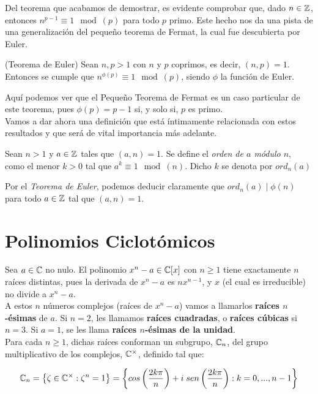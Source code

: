 Del teorema que acabamos de demostrar, es evidente comprobar que, dado $n \in \mathbb{Z}$, entonces $n^{p-1} \equiv 1 \mod(p)$ para todo $p$ primo. Este hecho nos da una pista de una generalización del pequeño teorema de Fermat, la cual fue descubierta por Euler.

\begin{teorema}{(Teorema de Euler)}
	Sean $n, p > 1$ con $n$ y $p$ coprimos, es decir, $(n, p) = 1$. Entonces se cumple que $n^{\phi(p)} \equiv 1 \mod(p)$, siendo $\phi$ la función de Euler.
\end{teorema}

Aquí podemos ver que el Pequeño Teorema de Fermat es un caso particular de este teorema, pues $\phi(p) = p-1$ si, y solo si, $p$ es primo.\\

Vamos a dar ahora una definición que está íntimamente relacionada con estos resultados y que será de vital importancia más adelante.

\begin{definicion}
	Sean $n > 1$ y $a \in \mathbb{Z}$ tales que $(a, n) = 1$. Se define el \textit{orden de $a$ módulo $n$}, como el menor $k > 0$ tal que $a^k \equiv 1 \mod(n)$. Dicho $k$ se denota por $ord_n(a)$
\end{definicion}

Por el \textit{Teorema de Euler}, podemos deducir claramente que $ord_n(a) \mid \phi(n)$ para todo $a \in \mathbb{Z}$ tal que $(a, n) = 1$.

\section{Polinomios Ciclotómicos}

Sea $a \in \mathbb{C}$ no nulo. El polinomio $x^n - a \in \mathbb{C}[x]$ con $n \geq 1$ tiene exactamente $n$ raíces distintas, pues la derivada de $x^n - a$ es $nx^{n-1}$, y $x$ (el cual es irreducible) no divide a $x^n - a$.\\

A estos $n$ números complejos (raíces de $x^n - a$) vamos a llamarlos \textbf{raíces $n$-ésimas} de $a$. Si $n=2$, les llamamos \textbf{raíces cuadradas}, o \textbf{raíces cúbicas} si $n=3$. Si $a=1$, se les llama \textbf{raíces $n$-ésimas de la unidad}.\\

Para cada $n \geq 1$, dichas raíces conforman un subgrupo, $\mathbb{C}_n$, del grupo multiplicativo de los complejos, $\mathbb{C}^\times$, definido tal que:

\[ \mathbb{C}_n = \left\lbrace \zeta \in \mathbb{C}^\times : \zeta^n = 1 \right\rbrace = \left\lbrace cos\left(\frac{2k\pi}{n}\right) + i\;sen\left(\frac{2k\pi}{n}\right): k=0,...,n-1  \right\rbrace \]

